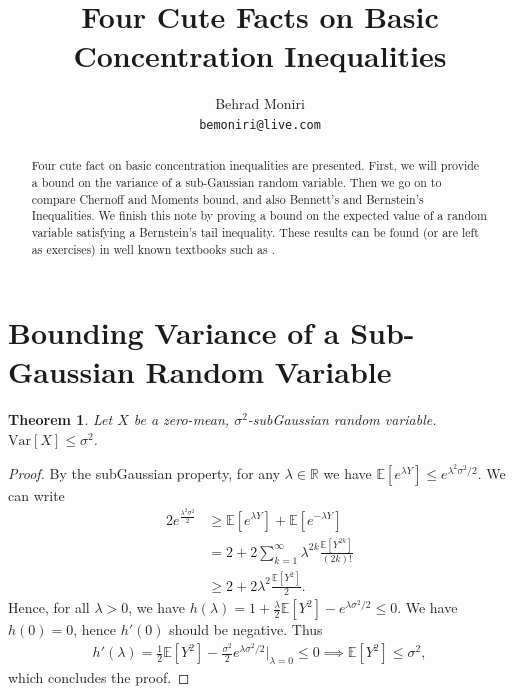 \documentclass[]{article}
\title{Four Cute Facts on Basic Concentration Inequalities}
\author{Behrad Moniri\\\texttt{bemoniri@live.com}}
\date{}
\newtheorem{theorem}{Theorem}
\newcommand{\R}{\mathbb{R}}
\newcommand{\E}{\mathbb{E}}
\begin{document}
\maketitle

\begin{abstract}
Four cute fact on basic concentration inequalities are presented. First, we will provide a bound on the variance of a sub-Gaussian random variable. Then we go on to compare Chernoff and Moments bound, and also Bennett's and Bernstein's Inequalities. We finish this note by proving a bound on the expected value of a random variable satisfying a Bernstein's tail inequality. These results can be found (or are left as exercises) in well known textbooks such as \cite{concentration, wainwright2019high}.
\end{abstract}

\section{Bounding Variance of a  Sub-Gaussian Random Variable}

\begin{theorem}
Let $X$ be a zero-mean, $\sigma^2$-subGaussian random variable. $\mathrm{Var}[X] \leq \sigma^2$.
\end{theorem}

\begin{proof}
By the subGaussian property, for any $\lambda \in \R$ we have 
$\E[e^{\lambda Y}] \leq e^{\lambda^2 \sigma^2 / 2}$. We can write
\begin{align}
2 e^{\frac{\lambda^2\sigma^2}{2}} &\geq \E[e^{\lambda Y}] + \E[e^{-\lambda Y}]   \\
&=2 + 2\sum_{k = 1}^{\infty} \lambda^{2k} \frac{\E[Y^{2k}]}{(2k)!}\\
&\geq 2 + 2\lambda^2 \frac{\E[Y^2]}{2}.
\end{align}
Hence, for all $\lambda >0$, we have $ h(\lambda) = 1 + \frac{\lambda}{2} \E[Y^2] - e^{\lambda\sigma^2/2} \leq 0$. We have $h(0) = 0$, hence $h'(0)$ should be negative. Thus
\begin{align}
h'(\lambda) = \frac{1}{2}  \E[Y^2] - \frac{\sigma^2}{2}e^{\lambda \sigma^2/2}\Big|_{\lambda = 0} \leq 0 \implies \E[Y^2] \leq \sigma^2,
\end{align}
which concludes the proof.
\end{proof}
\end{document}
